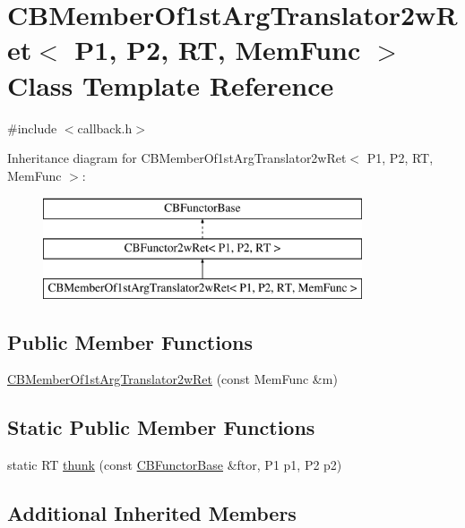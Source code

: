 \hypertarget{class_c_b_member_of1st_arg_translator2w_ret}{\section{C\+B\+Member\+Of1st\+Arg\+Translator2w\+Ret$<$ P1, P2, R\+T, Mem\+Func $>$ Class Template Reference}
\label{class_c_b_member_of1st_arg_translator2w_ret}
}


{\ttfamily \#include $<$callback.\+h$>$}

Inheritance diagram for C\+B\+Member\+Of1st\+Arg\+Translator2w\+Ret$<$ P1, P2, R\+T, Mem\+Func $>$\+:\begin{figure}[H]
\begin{center}
\leavevmode
\includegraphics[height=3.000000cm]{class_c_b_member_of1st_arg_translator2w_ret}
\end{center}
\end{figure}
\subsection*{Public Member Functions}
\begin{DoxyCompactItemize}
\item 
\hyperlink{class_c_b_member_of1st_arg_translator2w_ret_a044a1350fb9f59ba8ec38ea59305ed8f}{C\+B\+Member\+Of1st\+Arg\+Translator2w\+Ret} (const Mem\+Func \&m)
\end{DoxyCompactItemize}
\subsection*{Static Public Member Functions}
\begin{DoxyCompactItemize}
\item 
static R\+T \hyperlink{class_c_b_member_of1st_arg_translator2w_ret_a441af3982061f212f00b6f2d91cb10d4}{thunk} (const \hyperlink{class_c_b_functor_base}{C\+B\+Functor\+Base} \&ftor, P1 p1, P2 p2)
\end{DoxyCompactItemize}
\subsection*{Additional Inherited Members}


